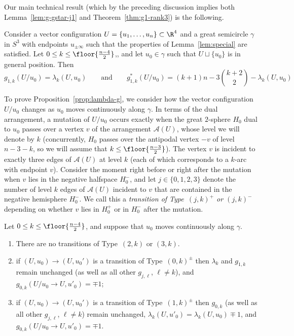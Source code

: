 Our main technical result (which by the preceding discussion implies both Lemma~\ref{lem:g-gstar-j1} and Theorem~\ref{thm:g1-rank3}) is the following. 
\begin{proposition}
\label{prop:lambda-g}
Consider a vector configuration $U=\{u_1,\dots,u_n\} \subset \R^4$ and a great semicircle $\gamma$ in $S^3$ with endpoints $u_{\pm \infty}$ such that the properties of Lemma~\ref{lem:special} are satisfied. 
%
Let $0\leq k\leq \floor{\frac{n-4}{2}}$,, and let $u_0\in \gamma$ such that $U\sqcup \{u_0\}$ is in general position. Then
\[
g_{1,k}(U/u_0)=\lambda_k(U,u_0)\qquad \textrm{and}\qquad g^*_{1,k}(U/u_0)=(k+1)n-3\binom{k+2}{2}-\lambda_k(U,u_0)
\]
\end{proposition}
%
To prove Proposition~\ref{prop:lambda-g}, we consider how the vector configuration $U/u_0$ changes as $u_0$ moves continuously along $\gamma$. In terms of the dual arrangement, a mutation of $U/u_0$ occurs exactly when the great $2$-sphere $H_0$ dual to $u_0$ passes over a vertex $v$ of the arrangement 
$\mathcal{A}(U)$, whose level we will denote by $k$ (concurrently, $H_0$ passes over the antipodal vertex $-v$ of level $n-3-k$, so we will assume that $k\leq \floor{\frac{n-3}{2}}$). The vertex $v$ is incident to exactly three edges of $\mathcal{A}(U)$ at level $k$ (each of which corresponds to a $k$-arc with endpoint $v$). Consider the moment right before or right after the mutation when $v$ lies in the negative halfspace $H_0^-$, and let $j\in \{0,1,2,3\}$ denote the number of level $k$ edges of $\mathcal{A}(U)$ incident to $v$ that are contained in the negative hemisphere $H_0^-$. We call this a \emph{transition of Type~$(j,k)^+$ or $(j,k)^-$} depending on whether $v$ lies in $H_0^+$ or in $H_0^-$ after the mutation.
%
\begin{lemma}
\label{lem:transitions}
Let $0\leq k\leq \floor{\frac{n-4}{2}}$, and suppose that $u_0$ moves continuously along $\gamma$. 
\begin{enumerate}
\item There are no transitions of Type~$(2,k)$ or $(3,k)$.
\item if $(U,u_0)\to (U,u_0')$ is a transition of Type~$(0,k)^{\pm}$ then $\lambda_k$ and $g_{1,k}$ remain unchanged (as well as all other $g_{j,\ell}$, $\ell \neq k$), and $g_{0,k}(U/u_0 \to U,u'_0) = \mp 1$; 
\item if $(U,u_0)\to (U,u_0')$ is a transition of Type~$(1,k)^{\pm}$ then $g_{0,k}$  (as well as all other $g_{j,\ell}$, $\ell \neq k$) remain unchanged, $\lambda_k(U,u'_0)=\lambda_k(U,u_0) \mp 1$, and $g_{0,k}(U/u_0 \to U,u'_0) = \mp 1$.
\end{enumerate}
\end{lemma}
